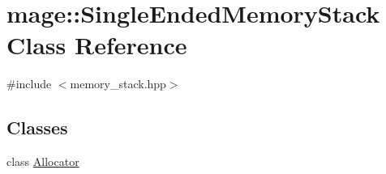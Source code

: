 \hypertarget{classmage_1_1_single_ended_memory_stack}{}\section{mage\+:\+:Single\+Ended\+Memory\+Stack Class Reference}
\label{classmage_1_1_single_ended_memory_stack}


{\ttfamily \#include $<$memory\+\_\+stack.\+hpp$>$}

\subsection*{Classes}
\begin{DoxyCompactItemize}
\item 
class \hyperlink{classmage_1_1_single_ended_memory_stack_1_1_allocator}{Allocator}
\end{DoxyCompactItemize}
